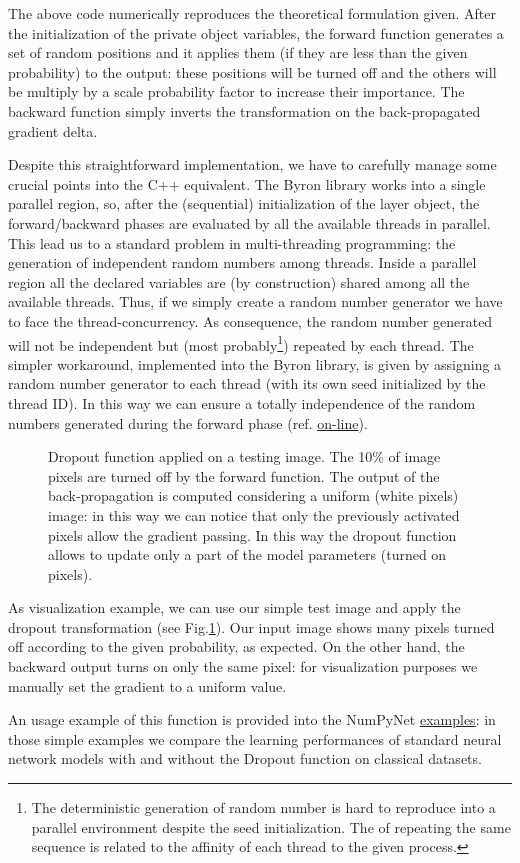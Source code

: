 \documentclass{standalone}
\begin{document}
The above code numerically reproduces the theoretical formulation given.
After the initialization of the private object variables, the forward function generates a set of random positions and it applies them (if they are less than the given probability) to the output: these positions will be turned off and the others will be multiply by a scale probability factor to increase their importance.
The backward function simply inverts the transformation on the back-propagated gradient \textsf{delta}.

Despite this straightforward implementation, we have to carefully manage some crucial points into the \textsf{C++} equivalent.
The \textsf{Byron} library works into a single parallel region, so, after the (sequential) initialization of the layer object, the forward/backward phases are evaluated by all the available threads in parallel.
This lead us to a standard problem in multi-threading programming: the generation of independent random numbers among threads.
Inside a parallel region all the declared variables are (by construction) shared among all the available threads.
Thus, if we simply create a random number generator we have to face the thread-concurrency.
As consequence, the random number generated will not be independent but (most probably\footnote{
  The deterministic generation of random number is hard to reproduce into a parallel environment despite the seed initialization.
  The  of repeating the same sequence is related to the affinity of each thread to the given process.
}) repeated by each thread.
The simpler workaround, implemented into the \textsf{Byron} library, is given by assigning a random number generator to each thread (with its own seed initialized by the thread ID).
In this way we can ensure a totally independence of the random numbers generated during the forward phase (ref. \href{https://github.com/Nico-Curti/Byron/blob/master/src/dropout_layer.cpp}{on-line}).

\begin{figure}[htbp]
\centering
\def\svgwidth{0.8\textwidth}

\caption{Dropout function applied on a testing image.
The 10\% of image pixels are turned off by the forward function.
The output of the back-propagation is computed considering a uniform (white pixels) image: in this way we can notice that only the previously activated pixels allow the gradient passing.
In this way the dropout function allows to update only a part of the model parameters (turned on pixels).
}
\label{fig:dropout}
\end{figure}

As visualization example, we can use our simple test image and apply the dropout transformation (see Fig.\ref{fig:dropout}).
Our input image shows many pixels turned off according to the given probability, as expected.
On the other hand, the backward output turns on only the same pixel: for visualization purposes we manually set the gradient to a uniform value.

An usage example of this function is provided into the \textsf{NumPyNet} \href{https://github.com/Nico-Curti/NumPyNet/tree/master/examples}{examples}: in those simple examples we compare the learning performances of standard neural network models with and without the Dropout function on classical datasets.
\end{document}
